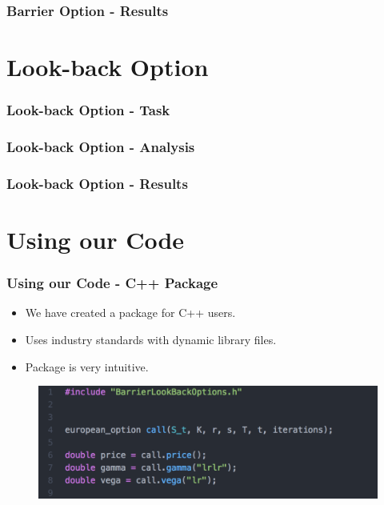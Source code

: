 \documentclass[12pt]{beamer}
\begin{document}
\begin{frame}
\frametitle{Barrier Option - Results}

\end{frame}


\section{Look-back Option}
\begin{frame}
\frametitle{Look-back Option - Task}

\end{frame}

\begin{frame}
\frametitle{Look-back Option - Analysis}
\end{frame}

\begin{frame}
\frametitle{Look-back Option - Results}

\end{frame}


\section{Using our Code}
\begin{frame}
\frametitle{Using our Code - C++ Package}
\begin{itemize}
  \item We have created a package for C++ users.
  \item Uses industry standards with dynamic library files.
  \item Package is very intuitive.
\end{itemize}

\begin{figure}[h!]
  \centering
\includegraphics[width=\textwidth]{graphs/code_easy_demo.png}
\end{figure}
\end{frame}
\end{document}
